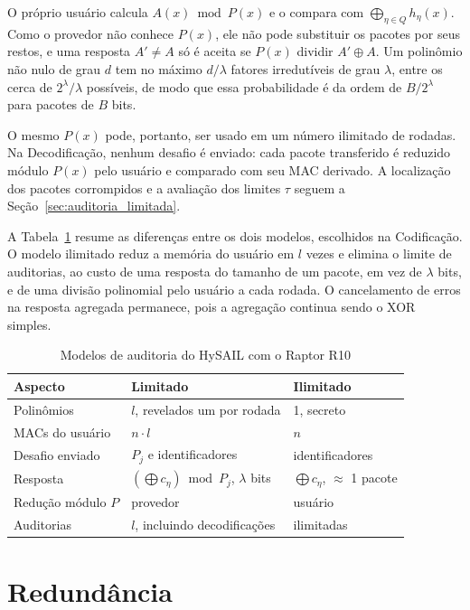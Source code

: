 \noindent O próprio usuário calcula $A(x) \bmod P(x)$ e o compara com $\bigoplus_{\eta \in Q} h_\eta(x)$. Como o provedor não conhece $P(x)$, ele não pode substituir os pacotes por seus restos, e uma resposta $A' \neq A$ só é aceita se $P(x)$ dividir $A' \oplus A$. Um polinômio não nulo de grau $d$ tem no máximo $d/\lambda$ fatores irredutíveis de grau $\lambda$, entre os cerca de $2^\lambda/\lambda$ possíveis, de modo que essa probabilidade é da ordem de $B/2^\lambda$ para pacotes de $B$ bits.

O mesmo $P(x)$ pode, portanto, ser usado em um número ilimitado de rodadas. Na Decodificação, nenhum desafio é enviado: cada pacote transferido é reduzido módulo $P(x)$ pelo usuário e comparado com seu \acrshort{MAC} derivado. A localização dos pacotes corrompidos e a avaliação dos limites $\tau$ seguem a Seção~\ref{sec:auditoria_limitada}.

A Tabela~\ref{tab:modelos_auditoria} resume as diferenças entre os dois modelos, escolhidos na Codificação. O modelo ilimitado reduz a memória do usuário em $l$ vezes e elimina o limite de auditorias, ao custo de uma resposta do tamanho de um pacote, em vez de $\lambda$ bits, e de uma divisão polinomial pelo usuário a cada rodada. O cancelamento de erros na resposta agregada permanece, pois a agregação continua sendo o XOR simples.

\begin{table}[htbp]
	\centering
	\caption{Modelos de auditoria do HySAIL com o Raptor R10}
	\label{tab:modelos_auditoria}
	\footnotesize
	\begin{tabular}{@{}lll@{}}
		\hline
		\textbf{Aspecto} & \textbf{Limitado} & \textbf{Ilimitado} \\
		\hline
		Polinômios & $l$, revelados um por rodada & 1, secreto \\
		\acrshort{MAC}s do usuário & $n \cdot l$ & $n$ \\
		Desafio enviado & $P_j$ e identificadores & identificadores \\
		Resposta & $\left(\bigoplus c_\eta\right) \bmod P_j$, $\lambda$ bits & $\bigoplus c_\eta$, $\approx$ 1 pacote \\
		Redução módulo $P$ & provedor & usuário \\
		Auditorias & $l$, incluindo decodificações & ilimitadas \\
		\hline
	\end{tabular}
\end{table}

\section{Redundância}
\label{sec:redundancia}

